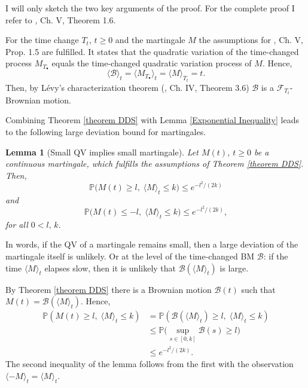 \documentclass[11pt]{article}
\makeatletter
\renewenvironment{proof}[1][\proofname]{
   \par\pushQED{\qed}\normalfont
   \topsep6\p@\@plus6\p@\relax
   \trivlist\item[\hskip\labelsep\bfseries#1\@addpunct{.}]
   \ignorespaces
}{
   \popQED\endtrivlist\@endpefalse
}
\numberwithin{equation}{section}
\newtheorem{lemma}[theorem]{Lemma}
\makeatother
\begin{document}
\begin{proof}
  \renewcommand{\qedsymbol}{}
  I will only sketch the two key arguments of the 
  proof. For the complete proof I refer to 
  \cite{revuz}, Ch. V, Theorem 1.6.

  For the time change $T_t$, $t\geq 0$ and the martingale 
  $M$ the assumptions for \cite{revuz}, Ch. V, Prop. 1.5 
  are fulfilled. It states that the quadratic variation 
  of the time-changed process $M_{T_{\bullet}}$ 
  equals the time-changed quadratic variation process of $M$. Hence, 
  \begin{equation}\nonumber
    \langle \mathcal{B} \rangle _t 
    = \langle M_{T_{\bullet}} \rangle _t 
    = \langle M \rangle _{T_t}
    = t.
  \end{equation} 
  Then, by Lévy's characterization theorem (\cite{revuz}, Ch. IV, Theorem 3.6) 
  $\mathcal{B}$ is a $\mathcal{F}_{T_t}$-Brownian motion.
\end{proof}

Combining Theorem \ref{theorem DDS} with Lemma \ref{Exponential Inequality} 
leads to the following large deviation bound for martingales. 

\begin{lemma} [Small QV implies small martingale]
  \label{Small QV implies small martingale}
  Let $M(t)$, $t \geq 0$ be a continuous martingale, 
  which fulfills the assumptions of Theorem \ref{theorem DDS}. 
  Then, 
  $$
  \mathbb{P} \big( M(t) \geq l, \; 
    \langle M \rangle _t \leq k \big)
      \leq  e^{-l^2/(2k)}
  $$
  and
  $$
  \mathbb{P} \big( M(t) \leq -l, \; 
    \langle M \rangle _t \leq k \big)
      \leq  e^{-l^2/(2k)},
  $$
  for all $0 < l, \, k$.
\end{lemma}

In words, if the QV of a martingale 
remains small, then a large deviation of the martingale itself is unlikely.
Or at the level of the time-changed BM $\mathcal{B}$:
if the time $\langle M  \rangle_t$ elapses slow, then it is unlikely that 
$\mathcal{B}({\langle M \rangle_t})$ is large.

\begin{proof}  
  By Theorem \ref{theorem DDS} there 
  is a Brownian motion $\mathcal{B}(t)$ such that 
  $M(t) = \mathcal{B}(\langle M  \rangle_t)$.
  Hence,
  \begin{equation}\nonumber
    \begin{split}
  \mathbb{P}( M(t) \geq l, \; 
    \langle M \rangle _t \leq k) 
  & = \mathbb{P}( 
    \mathcal{B}(\langle M  \rangle_t)
      \geq l, \; 
        \langle M \rangle _t \leq k) \\
  & \leq \mathbb{P} \bigg(
    \sup _{s \in [0,k]} 
      \mathcal{B}(s) \geq l \bigg)\\
  & \leq  e^{- l^2/(2k)}. 
  \end{split}
  \end{equation}
  The second inequality of the lemma 
  follows from the first  
  with the observation 
  $\langle -M \rangle _t = \langle M \rangle _t$.
\end{proof}
\end{document}

